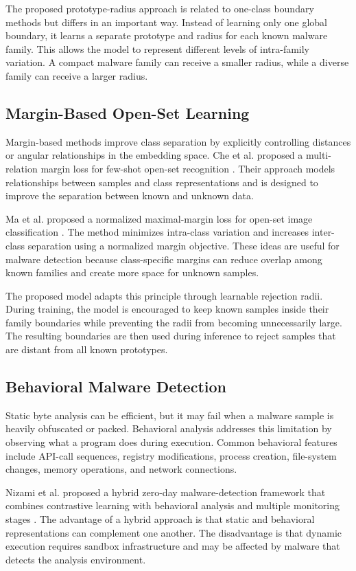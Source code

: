\documentclass[12pt,a4paper]{article}
\begin{document}
The proposed prototype-radius approach is related to one-class boundary methods but differs in an important way. Instead of learning only one global boundary, it learns a separate prototype and radius for each known malware family. This allows the model to represent different levels of intra-family variation. A compact malware family can receive a smaller radius, while a diverse family can receive a larger radius.

\subsection{Margin-Based Open-Set Learning}

Margin-based methods improve class separation by explicitly controlling distances or angular relationships in the embedding space. Che et al. proposed a multi-relation margin loss for few-shot open-set recognition \citep{che2023}. Their approach models relationships between samples and class representations and is designed to improve the separation between known and unknown data.

Ma et al. proposed a normalized maximal-margin loss for open-set image classification \citep{ma2021}. The method minimizes intra-class variation and increases inter-class separation using a normalized margin objective. These ideas are useful for malware detection because class-specific margins can reduce overlap among known families and create more space for unknown samples.

The proposed model adapts this principle through learnable rejection radii. During training, the model is encouraged to keep known samples inside their family boundaries while preventing the radii from becoming unnecessarily large. The resulting boundaries are then used during inference to reject samples that are distant from all known prototypes.

\subsection{Behavioral Malware Detection}

Static byte analysis can be efficient, but it may fail when a malware sample is heavily obfuscated or packed. Behavioral analysis addresses this limitation by observing what a program does during execution. Common behavioral features include API-call sequences, registry modifications, process creation, file-system changes, memory operations, and network connections.

Nizami et al. proposed a hybrid zero-day malware-detection framework that combines contrastive learning with behavioral analysis and multiple monitoring stages \citep{nizami2024}. The advantage of a hybrid approach is that static and behavioral representations can complement one another. The disadvantage is that dynamic execution requires sandbox infrastructure and may be affected by malware that detects the analysis environment.
\end{document}
